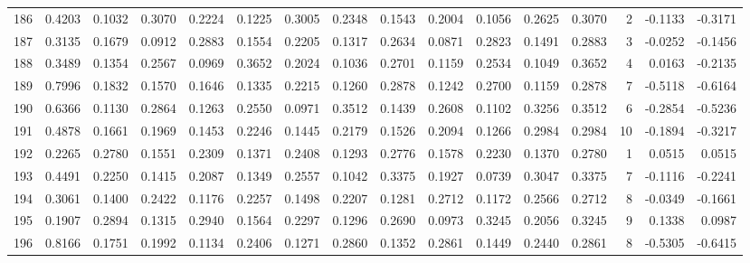 \begin{tabular}{lrrrrrrrrrrrrrrr}
186 &      0.4203 &  0.1032 &  0.3070 &  0.2224 &  0.1225 &  0.3005 &  0.2348 &  0.1543 &  0.2004 &  0.1056 &   0.2625 &     0.3070 &      2 &                   -0.1133 &                    -0.3171 \\
187 &      0.3135 &  0.1679 &  0.0912 &  0.2883 &  0.1554 &  0.2205 &  0.1317 &  0.2634 &  0.0871 &  0.2823 &   0.1491 &     0.2883 &      3 &                   -0.0252 &                    -0.1456 \\
188 &      0.3489 &  0.1354 &  0.2567 &  0.0969 &  0.3652 &  0.2024 &  0.1036 &  0.2701 &  0.1159 &  0.2534 &   0.1049 &     0.3652 &      4 &                    0.0163 &                    -0.2135 \\
189 &      0.7996 &  0.1832 &  0.1570 &  0.1646 &  0.1335 &  0.2215 &  0.1260 &  0.2878 &  0.1242 &  0.2700 &   0.1159 &     0.2878 &      7 &                   -0.5118 &                    -0.6164 \\
190 &      0.6366 &  0.1130 &  0.2864 &  0.1263 &  0.2550 &  0.0971 &  0.3512 &  0.1439 &  0.2608 &  0.1102 &   0.3256 &     0.3512 &      6 &                   -0.2854 &                    -0.5236 \\
191 &      0.4878 &  0.1661 &  0.1969 &  0.1453 &  0.2246 &  0.1445 &  0.2179 &  0.1526 &  0.2094 &  0.1266 &   0.2984 &     0.2984 &     10 &                   -0.1894 &                    -0.3217 \\
192 &      0.2265 &  0.2780 &  0.1551 &  0.2309 &  0.1371 &  0.2408 &  0.1293 &  0.2776 &  0.1578 &  0.2230 &   0.1370 &     0.2780 &      1 &                    0.0515 &                     0.0515 \\
193 &      0.4491 &  0.2250 &  0.1415 &  0.2087 &  0.1349 &  0.2557 &  0.1042 &  0.3375 &  0.1927 &  0.0739 &   0.3047 &     0.3375 &      7 &                   -0.1116 &                    -0.2241 \\
194 &      0.3061 &  0.1400 &  0.2422 &  0.1176 &  0.2257 &  0.1498 &  0.2207 &  0.1281 &  0.2712 &  0.1172 &   0.2566 &     0.2712 &      8 &                   -0.0349 &                    -0.1661 \\
195 &      0.1907 &  0.2894 &  0.1315 &  0.2940 &  0.1564 &  0.2297 &  0.1296 &  0.2690 &  0.0973 &  0.3245 &   0.2056 &     0.3245 &      9 &                    0.1338 &                     0.0987 \\
196 &      0.8166 &  0.1751 &  0.1992 &  0.1134 &  0.2406 &  0.1271 &  0.2860 &  0.1352 &  0.2861 &  0.1449 &   0.2440 &     0.2861 &      8 &                   -0.5305 &                    -0.6415 \\

\end{tabular}
